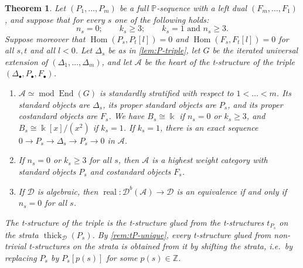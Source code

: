 \documentclass[11pt,reqno]{amsart}
\theoremstyle{plain}
\newtheorem{theorem}{Theorem}[section]
\theoremstyle{definition}
\theoremstyle{remark}
\newcommand{\kk}{\Bbbk}
\DeclareMathOperator{\Hom}{Hom}
\DeclareMathOperator{\End}{End}
\DeclareMathOperator{\real}{real}
\newcommand{\modd}{\operatorname{mod}}
\newcommand{\Db}{\mathcal{D}^b}
\newcommand{\thick}[2][\cD]{\operatorname{thick}_{#1}(#2)}
\newcommand{\cD}{\mathcal{D}}
\newcommand{\cA}{\mathcal{A}}
\begin{document}
\begin{theorem}\label{thm:Pseq}
Let $(P_1,\dots,P_m)$ be a full $\mathbb{P}$-sequence with a left dual $(F_m,\dots,F_1)$, and suppose that for every $s$ one of the following holds:
\[n_s=0;\qquad k_s\ge3;\qquad k_s=1\text{ and }n_s\ge3.\]
Suppose moreover that $\Hom(P_s,P_t[l])=0$ and $\Hom(F_s,F_t[l])=0$ for all $s,t$ and all $l<0$. Let $\Delta_s$ be as in \cref{lem:P-triple}, let $G$ be the iterated universal extension of $(\Delta_1,\dots,\Delta_m)$, and let $\cA$ be the heart of the t-structure of the triple $(\Delta_\bullet,P_\bullet,F_\bullet)$.
\begin{enumerate}
\item $\cA\simeq\modd\End(G)$ is standardly stratified with respect to $1<\dots<m$. Its standard objects are $\Delta_s$, its proper standard objects are $P_s$, and its proper costandard objects are $F_s$. We have $B_s\cong\kk$ if $n_s=0$ or $k_s\ge3$, and $B_s\cong\kk[x]/(x^2)$ if $k_s=1$. If $k_s=1$, there is an exact sequence $0\to P_s\to\Delta_s\to P_s\to0$ in $\cA$.
\item If $n_s=0$ or $k_s\ge3$ for all $s$, then $\cA$ is a highest weight category with standard objects $P_s$ and costandard objects $F_s$.
\item If $\cD$ is algebraic, then $\real\colon\Db(\cA)\to\cD$ is an equivalence if and only if $n_s=0$ for all $s$.
\end{enumerate}
The t-structure of the triple is the t-structure glued from the t-structures $t_{P_s}$ on the strata $\thick{P_s}$. By \cref{rem:tP-unique}, every t-structure glued from non-trivial t-structures on the strata is obtained from it by shifting the strata, i.e.\ by replacing $P_s$ by $P_s[p(s)]$ for some $p(s)\in\mathbb{Z}$.
\end{theorem}
\end{document}
